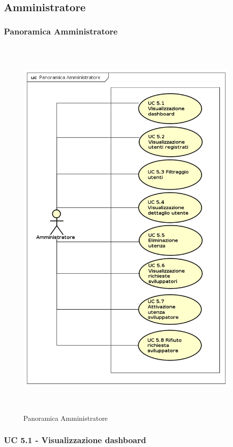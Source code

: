 \subsection{Amministratore}

\subsubsection{Panoramica Amministratore}
\begin{figure}[H]
\centering
\includegraphics[width=17cm, height= 20cm]{img/PanoramicaAmministratore.png} 
\caption{Panoramica Amministratore}
\end{figure}


\subsubsection{UC 5.1 - Visualizzazione dashboard}

